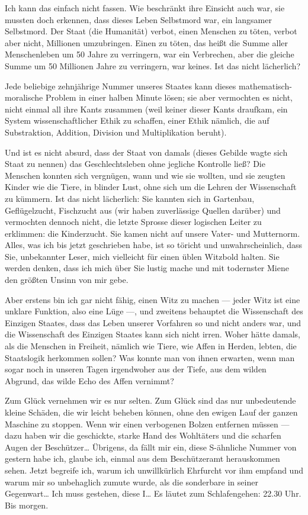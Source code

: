 Ich kann das einfach nicht fassen. Wie beschränkt ihre Einsicht
auch war, sie mussten doch erkennen, dass dieses Leben Selbstmord
war, ein langsamer Selbstmord. Der Staat (die Humanität) verbot,
einen Menschen zu töten, verbot aber nicht, Millionen umzubringen.
Einen zu töten, das heißt die Summe aller Menschenleben um 50 Jahre
zu verringern, war ein Verbrechen, aber die gleiche Summe um 50
Millionen Jahre zu verringern, war keines. Ist das nicht
lächerlich?

Jede beliebige zehnjährige Nummer unseres Staates kann dieses
mathematisch-moralische Problem in einer halben Minute lösen; sie
aber vermochten es nicht, nicht einmal all ihre Kants zusammen
(weil keiner dieser Kants draufkam, ein System wissenschaftlicher
Ethik zu schaffen, einer Ethik nämlich, die auf Substraktion,
Addition, Division und Multiplikation beruht).

Und ist es nicht absurd, dass der Staat von damals (dieses Gebilde
wagte sich Staat zu nennen) das Geschlechtsleben ohne jegliche
Kontrolle ließ? Die Menschen konnten sich vergnügen, wann und wie
sie wollten, und sie zeugten Kinder wie die Tiere, in blinder Lust,
ohne sich um die Lehren der Wissenschaft zu kümmern. Ist das nicht
lächerlich: Sie kannten sich in Gartenbau, Geflügelzucht,
Fischzucht aus (wir haben zuverlässige Quellen darüber) und
vermochten dennoch nicht, die letzte Sprosse dieser logischen
Leiter zu erklimmen: die Kinderzucht. Sie kamen nicht auf unsere
Vater- und Mutternorm. Alles, was ich bis jetzt geschrieben habe,
ist so töricht und unwahrscheinlich, dass Sie, unbekannter Leser,
mich vielleicht für einen üblen Witzbold halten. Sie werden denken,
dass ich mich über Sie lustig mache und mit todernster Miene den
größten Unsinn von mir gebe.

Aber erstens bin ich gar nicht fähig, einen Witz zu machen — jeder
Witz ist eine unklare Funktion, also eine Lüge —, und zweitens
behauptet die Wissenschaft des Einzigen Staates, dass das Leben
unserer Vorfahren so und nicht anders war, und die Wissenschaft des
Einzigen Staates kann sich nicht irren. Woher hätte damals, als
die Menschen in Freiheit, nämlich wie Tiere, wie Affen in Herden,
lebten, die Staatslogik herkommen sollen? Was konnte man von ihnen
erwarten, wenn man sogar noch in unseren Tagen irgendwoher aus der
Tiefe, aus dem wilden Abgrund, das wilde Echo des Affen vernimmt?

Zum Glück vernehmen wir es nur selten. Zum Glück sind das nur
unbedeutende kleine Schäden, die wir leicht beheben können, ohne
den ewigen Lauf der ganzen Maschine zu stoppen. Wenn wir einen
verbogenen Bolzen entfernen müssen — dazu haben wir die geschickte,
starke Hand des Wohltäters und die scharfen Augen der Beschützer\ldots{}
Übrigens, da fällt mir ein, diese S-ähnliche Nummer von gestern
habe ich, glaube ich, einmal aus dem Beschützeramt herauskommen
sehen. Jetzt begreife ich, warum ich unwillkürlich Ehrfurcht vor
ihm empfand und warum mir so unbehaglich zumute wurde, als die
sonderbare  in seiner Gegenwart\ldots{} Ich muss gestehen, diese
I\ldots{} Es läutet zum Schlafengehen: 22.30 Uhr. Bis morgen.

